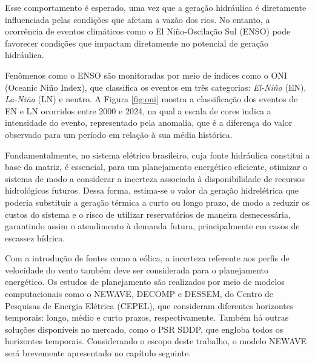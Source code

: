 \begin{figure}[!ht]
	{}
	{}
\end{figure}

Esse comportamento é esperado, uma vez que a geração hidráulica é diretamente influenciada pelas condições
que afetam a vazão dos rios. No entanto, a ocorrência de eventos climáticos como o El Niño-Oscilação Sul (ENSO) pode
favorecer condições que impactam diretamente no potencial de geração hidráulica. \cite{de2012influencia}

\begin{figure}[!ht]
	{}
	{}
\end{figure}

Fenômenos como o ENSO são monitoradas por meio de índices como o ONI (Oceanic Niño Index), que classifica os 
eventos em três categorias: \textit{El-Niño} (EN), \textit{La-Niña} (LN) e neutro. A Figura \ref{fig:oni} mostra a 
classificação dos eventos de EN e LN ocorridos entre 2000 e 2024, na qual a escala de cores indica a intensidade do 
evento, representado pela anomalia, que é a diferença do valor observado para um período em relação à sua média histórica.


Fundamentalmente, no sistema elétrico brasileiro, cuja fonte hidráulica constitui a base da matriz, é essencial, para um
planejamento energético eficiente, otimizar o sistema de modo a considerar a incerteza associada à disponibilidade de recursos
hidrológicos futuros. Dessa forma, estima-se o valor da geração hidrelétrica que poderia substituir a geração térmica a curto
ou longo prazo, de modo a reduzir os custos do sistema e o risco de utilizar reservatórios de maneira desnecessária, garantindo
assim o atendimento à demanda futura, principalmente em casos de escassez hídrica.

Com a introdução de fontes como a eólica, a incerteza referente aos perfis de velocidade do vento também deve ser considerada
para o planejamento energético. Os estudos de planejamento são realizados por meio de modelos computacionais como o NEWAVE, 
DECOMP e DESSEM, do Centro de Pesquisas de Energia Elétrica (CEPEL), que consideram diferentes horizontes temporais: longo, 
médio e curto prazos, respectivamente. Também há outras soluções disponíveis no mercado, como o PSR SDDP, que engloba todos
os horizontes temporais. Considerando o escopo deste trabalho, o modelo NEWAVE será brevemente apresentado no capítulo seguinte.

